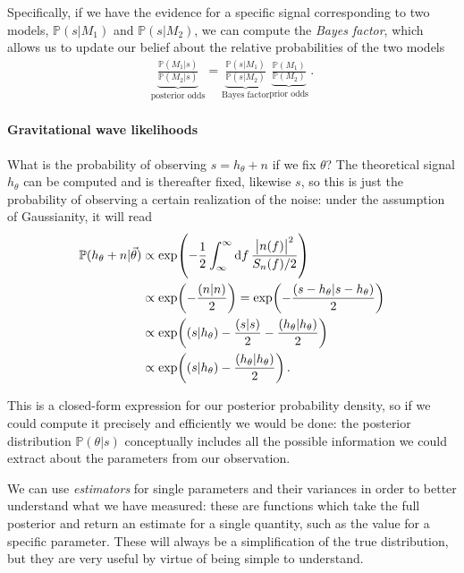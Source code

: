 \documentclass[main.tex]{subfiles}
\begin{document}
Specifically, if we have the evidence for a specific signal corresponding to two models, \(\mathbb{P}(s | M_1 )\) and \(\mathbb{P}(s | M_2 )\), we can compute the \emph{Bayes factor}, which allows us to update our belief about the relative probabilities of the two models 
%
\begin{align}
\underbrace{\frac{\mathbb{P}(M_1 | s)}{\mathbb{P}(M_2 | s)}}_{\text{posterior odds}} = \underbrace{\frac{\mathbb{P}(s | M_1 )}{\mathbb{P}(s | M_2 )}}_{\text{Bayes factor}} \underbrace{\frac{\mathbb{P}(M_1 )}{\mathbb{P}(M_2 )}}_{\text{prior odds}}
\,.
\end{align}

\paragraph{Gravitational wave likelihoods}

What is the probability of observing \(s = h_\theta + n\) if we fix \(\theta \)? The theoretical signal \(h_\theta \) can be computed and is thereafter fixed, likewise \(s\), so this is just the probability of observing a certain realization of the noise: under the assumption of Gaussianity, it will read 
%
\begin{subequations}
\begin{align}
\mathbb{P}(h_\theta + n | \vec{\theta})  
&\propto \exp( - \frac{1}{2} \int_{\infty }^{\infty } \dd{f} \frac{\abs{n(f)}^2}{S_n(f) / 2} )
\\
&\propto 
\exp(- \frac{(n|n)}{2}) 
= \exp( - \frac{(s-h_\theta | s-h_\theta )}{2} )  \\
&\propto \exp(
     (s | h_\theta ) 
     - \frac{(s|s)}{2} 
     - \frac{(h_\theta |h_\theta )}{2}
     )  \\
&\propto \exp( (s | h_\theta ) - 
\frac{(h_\theta | h_\theta )}{2})
\,.
\end{align}
\end{subequations}

This is a closed-form expression for our posterior probability density, so if we could compute it precisely and efficiently we would be done: the posterior distribution \(\mathbb{P}(\theta | s)\) conceptually includes all the possible information we could extract about the parameters from our observation. 

We can use \emph{estimators} for single parameters and their variances in order to better understand what we have measured: these are functions which take the full posterior and return an estimate for a single quantity, such as the value for a specific parameter.
These will always be a simplification of the true distribution, but they are very useful by virtue of being simple to understand.
\end{document}
